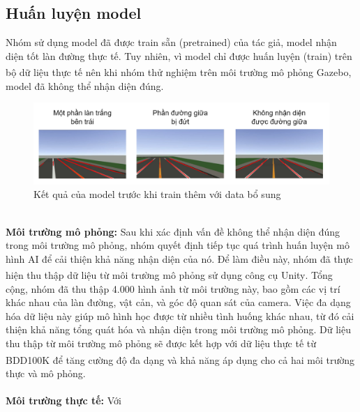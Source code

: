 \subsection{Huấn luyện model}
Nhóm sử dụng model đã được train sẵn (pretrained) của tác giả, model nhận diện tốt làn đường thực tế. Tuy nhiên, vì model chỉ được huấn luyện (train) trên bộ dữ liệu thực tế nên khi nhóm thử nghiệm trên môi trường mô phỏng Gazebo\textsuperscript{\cite{gazebo}}, model đã không thể nhận diện đúng.\\
\begin{figure}[!hbt]
\begin{center}
    \includegraphics[width=15cm]{img/4_Implement/ai/simulation_error.png}
    \caption{Kết quả của model trước khi train thêm với data bổ sung}
\end{center}
\end{figure}\\
\textbf{Môi trường mô phỏng:}
Sau khi xác định vấn đề không thể nhận diện đúng trong môi trường mô phỏng, nhóm quyết định tiếp tục quá trình huấn luyện mô hình AI để cải thiện khả năng nhận diện của nó. Để làm điều này, nhóm đã thực hiện thu thập dữ liệu từ môi trường mô phỏng sử dụng công cụ Unity\textsuperscript{\cite{unity}}. Tổng cộng, nhóm đã thu thập 4.000 hình ảnh từ môi trường này, bao gồm các vị trí khác nhau của làn đường, vật cản, và góc độ quan sát của camera. Việc đa dạng hóa dữ liệu này giúp mô hình học được từ nhiều tình huống khác nhau, từ đó cải thiện khả năng tổng quát hóa và nhận diện trong môi trường mô phỏng. Dữ liệu thu thập từ môi trường mô phỏng sẽ được kết hợp với dữ liệu thực tế từ BDD100K\textsuperscript{\cite{bdd100k}} để tăng cường độ đa dạng và khả năng áp dụng cho cả hai môi trường thực và mô phỏng.\\\\
\textbf{Môi trường thực tế:} Với 
\noindent 
\newpage
